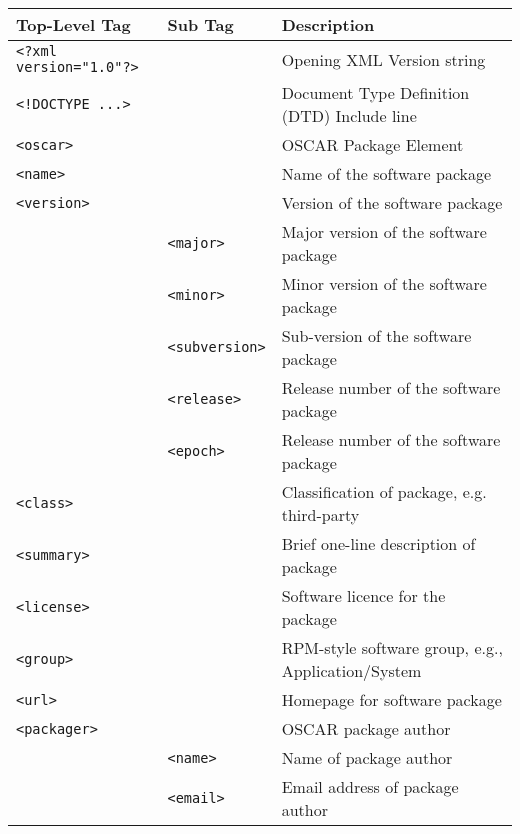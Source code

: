\begin{table}[htbp]
  \begin{center}
  \begin{tabular}{|l|l|l|} \hline
  {\bfseries Top-Level Tag} & {\bfseries Sub Tag} & {\bfseries Description}\\\hline
  \hline
  \verb(<?xml version="1.0"?>( & &  Opening XML Version string         \\ \hline

  \verb(<!DOCTYPE ...>( & & Document Type Definition (DTD) Include line\\ \hline
  \verb(<oscar>(   &   & OSCAR Package Element                         \\ \hline
  \verb(<name>(    &   & Name of the software package                  \\ \hline

  \verb(<version>( &   & Version of the software package           \\\cline{2-3}
     & \verb(<major>(  & Major version of the software package     \\\cline{2-3}
     & \verb(<minor>(  & Minor version of the software package     \\\cline{2-3}
     & \verb(<subversion>( & Sub-version of the software package   \\\cline{2-3}
     & \verb(<release>(    & Release number of the software package\\\cline{2-3}
     & \verb(<epoch>(      & Release number of the software package\\\hline

  \verb(<class>(   &   & Classification of package, e.g. third-party   \\ \hline
  \verb(<summary>( &   & Brief one-line description of package         \\ \hline
  \verb(<license>( &   & Software licence for the package              \\ \hline
  \verb(<group>(   &   & RPM-style software group, e.g., Application/System\\\hline
  \verb(<url>(     &   & Homepage for software package                 \\ \hline

  \verb(<packager>(&   & OSCAR package author                      \\\cline{2-3}
     & \verb(<name>(   & Name of package author                    \\\cline{2-3}
     & \verb(<email>(  & Email address of package author           \\\hline


\end{tabular}
\end{center}
\end{table}
